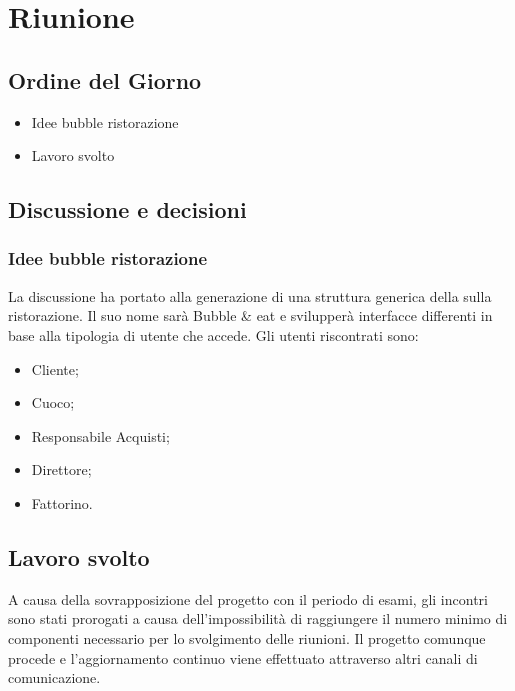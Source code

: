 
\section{Riunione}
\subsection{Ordine del Giorno}
\begin{itemize}
	\item Idee bubble ristorazione
	\item Lavoro svolto
\end{itemize}

\subsection{Discussione e decisioni}
\subsubsection{Idee bubble ristorazione}
La discussione ha portato alla generazione di una struttura generica della  sulla ristorazione. Il suo nome sarà Bubble \& eat e svilupperà interfacce differenti in base alla tipologia di utente che accede.
Gli utenti riscontrati sono:
\begin{itemize}
	\item Cliente;
	\item Cuoco;
	\item Responsabile Acquisti;
	\item Direttore;
	\item Fattorino.
\end{itemize}

\subsection{Lavoro svolto}
A causa della sovrapposizione del progetto con il periodo di esami, gli incontri sono stati prorogati a causa dell'impossibilità di raggiungere il numero minimo di componenti necessario per lo svolgimento delle riunioni. Il progetto comunque procede e l'aggiornamento continuo viene effettuato attraverso altri canali di comunicazione.
 

\clearpage
